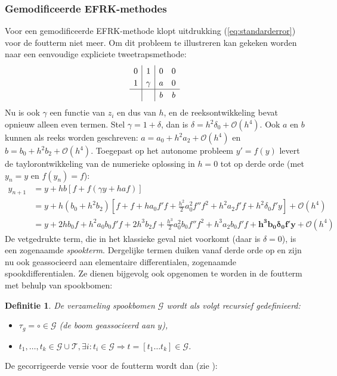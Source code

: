 \documentclass[12pt]{article}
\newtheorem{defn}{Definitie}
\begin{document}
\subsubsection{Gemodificeerde EFRK-methodes}
Voor een gemodificeerde EFRK-methode klopt uitdrukking (\ref{eq:standarderror}) voor de foutterm niet meer. Om dit probleem te illustreren kan gekeken worden naar een eenvoudige expliciete tweetrapsmethode:
\[
\renewcommand\arraystretch{1.2}
\begin{array}
{c|c|cc}
0 & 1 & 0 & 0 \\
1 & \gamma & a & 0 \\
\hline
&& b & b 
\end{array}
\]
Nu is ook \(\gamma\) een functie van \(z_i\) en dus van \(h\), en de reeksontwikkeling bevat opnieuw alleen even termen. Stel \(\gamma=1+\delta\), dan is \(\delta=h^2\delta_0+\mathcal{O}(h^4)\). Ook \(a\) en \(b\) kunnen als reeks worden geschreven: \(a=a_0+h^2a_2+\mathcal{O}(h^4)\) en \(b=b_0+h^2b_2+\mathcal{O}(h^4)\). Toegepast op het autonome probleem \(y'=f(y)\) levert de taylorontwikkeling van de numerieke oplossing in \(h=0\) tot op derde orde (met \(y_n=y\) en \(f(y_n)=f\)):
\begin{align*}
     y_{n+1}&=y+hb[f+f(\gamma y+haf)] \\
     &=y+h(b_0+h^2b_2)[f+f+ha_0f'f+\frac{h^2}{2}a_0^2f''f^2+h^2a_2f'f+h^2\delta_0f'y]+\mathcal{O}(h^4) \\
     &=y+2hb_0f+h^2a_0b_0f'f+2h^3b_2f+\frac{h^3}{2}a_0^2b_0f''f^2+h^3a_2b_0f'f+\mathbf{h^3b_0\boldsymbol\delta_0f'y}+\mathcal{O}(h^4)
\end{align*}
De vetgedrukte term, die in het klassieke geval niet voorkomt (daar is \(\delta=0\)), is een zogenaamde \textit{spookterm}. Dergelijke termen duiken vanaf derde orde op en zijn nu ook geassocieerd aan elementaire differentialen, zogenaamde spookdifferentialen. Ze dienen bijgevolg ook opgenomen te worden in de foutterm met behulp van spookbomen:
\begin{defn}
De verzameling spookbomen \(\mathcal{G}\) wordt als volgt recursief gedefinieerd:
\begin{itemize}
    \item \(\tau_g=\circ\in\mathcal{G}\) (de boom geassocieerd aan \(y\)),
    \item \(t_1,\dots,t_k\in\mathcal{G}\cup\mathcal{T},\exists i:t_i\in\mathcal{G}\Rightarrow t=[t_1\dots t_k]\in\mathcal{G}\).
\end{itemize}
\end{defn}
De gecorrigeerde versie voor de foutterm wordt dan (zie \cite{ghosttrees}):
\end{document}
